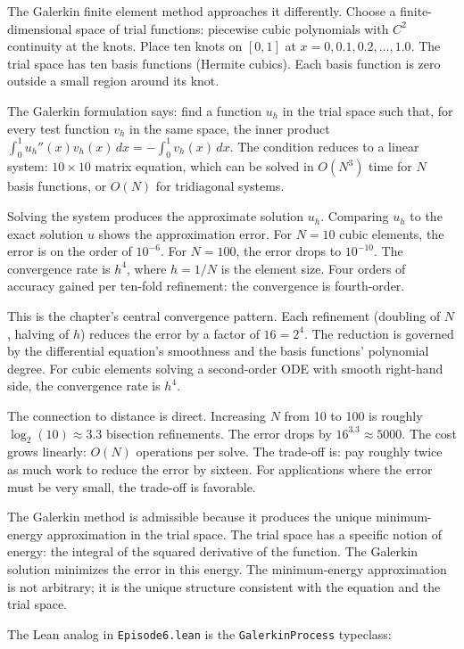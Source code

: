 The Galerkin finite element method approaches it differently. Choose a
finite-dimensional space of trial functions: piecewise cubic
polynomials with $C^2$ continuity at the knots. Place ten knots on
$[0, 1]$ at $x = 0, 0.1, 0.2, \ldots, 1.0$. The trial space has ten
basis functions (Hermite cubics). Each basis function is zero outside a
small region around its knot.

The Galerkin formulation says: find a function $u_h$ in the trial space
such that, for every test function $v_h$ in the same space, the inner
product $\int_0^1 u_h''(x) v_h(x) \, dx = -\int_0^1 v_h(x) \, dx$. The
condition reduces to a linear system: $10 \times 10$ matrix equation,
which can be solved in $O(N^3)$ time for $N$ basis functions, or
$O(N)$ for tridiagonal systems.

Solving the system produces the approximate solution $u_h$. Comparing
$u_h$ to the exact solution $u$ shows the approximation error. For $N
= 10$ cubic elements, the error is on the order of $10^{-6}$. For $N
= 100$, the error drops to $10^{-10}$. The convergence rate is $h^4$,
where $h = 1/N$ is the element size. Four orders of accuracy gained
per ten-fold refinement: the convergence is fourth-order.

This is the chapter's central convergence pattern. Each refinement
(doubling of $N$, halving of $h$) reduces the error by a factor of
$16 = 2^4$. The reduction is governed by the differential equation's
smoothness and the basis functions' polynomial degree. For cubic
elements solving a second-order ODE with smooth right-hand side, the
convergence rate is $h^4$.

The connection to distance is direct. Increasing $N$ from 10 to 100
is roughly $\log_2(10) \approx 3.3$ bisection refinements. The error
drops by $16^{3.3} \approx 5000$. The cost grows linearly: $O(N)$
operations per solve. The trade-off is: pay roughly twice as much
work to reduce the error by sixteen. For applications where the
error must be very small, the trade-off is favorable.

The Galerkin method is admissible because it produces the unique
minimum-energy approximation in the trial space. The trial space has
a specific notion of energy: the integral of the squared derivative
of the function. The Galerkin solution minimizes the error in this
energy. The minimum-energy approximation is not arbitrary; it is the
unique structure consistent with the equation and the trial space.

The Lean analog in \texttt{Episode6.lean} is the \texttt{GalerkinProcess}
typeclass:

